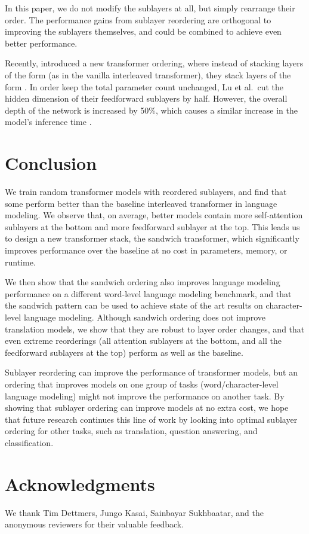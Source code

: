 \documentclass[11pt,a4paper]{article}
\begin{document}
In this paper, we do not modify the sublayers at all, but simply rearrange their order. The performance gains from sublayer reordering are orthogonal to improving the sublayers themselves, and could be combined to achieve even better performance.

Recently, \citet{lu2019understanding} introduced a new transformer ordering, where instead of stacking layers of the form {\Large \texttt{}} (as in the vanilla interleaved transformer), they stack layers of the form {\Large \texttt{}}. In order keep the total parameter count unchanged, Lu et al.~cut the hidden dimension of their feedforward sublayers by half. However, the overall depth of the network is increased by 50\%, which causes a similar increase in the model's inference time \cite{sanh_2019}. 
 \section{Conclusion}
We train random transformer models with reordered sublayers, and find that some perform better than the baseline interleaved transformer in language modeling. We observe that, on average, better models contain more self-attention sublayers at the bottom and more feedforward sublayer at the top. This leads us to design a new transformer stack, the sandwich transformer, which significantly improves performance over the baseline at no cost in parameters, memory, or runtime. 

We then show that the sandwich ordering also improves language modeling performance on a different word-level language modeling benchmark, and that the sandwich pattern can be used to achieve state of the art results on character-level language modeling. 
Although sandwich ordering does not improve translation models, we show that they are robust to layer order changes, and that even extreme reorderings (all attention sublayers at the bottom, and all the feedforward sublayers at the top) perform as well as the baseline.

Sublayer reordering can improve the performance of transformer models, but an ordering that improves models on one group of tasks (word/character-level language modeling) might not improve the performance on another task. By showing that sublayer ordering can improve models at no extra cost, we hope that future research continues this line of work by looking into optimal sublayer ordering for other tasks, such as translation, question answering, and classification.
 
\section*{Acknowledgments}
We thank Tim Dettmers, Jungo Kasai,  Sainbayar Sukhbaatar, and the anonymous reviewers for their valuable feedback.



\end{document}
